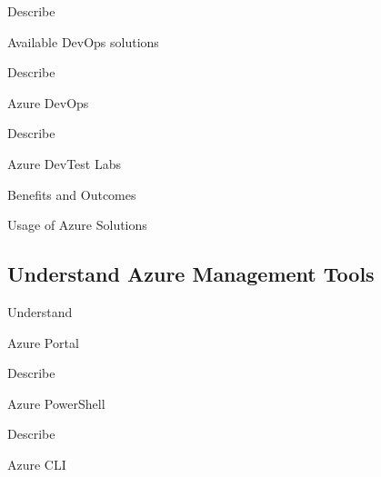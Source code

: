 \documentclass{scrartcl}
\newenvironment{flashcard}[2][]{%
    #1
    \vfill
    \centerline{\Large{#2}}
    \vfill
    \newpage
}
{\newpage}
\newcommand{\subsectioncard}[1]{
    \vspace*{\stretch{1}}
    \subsection{#1}
    \vspace*{\stretch{1}}
    \pagebreak
}
\begin{document}
    \begin{flashcard}[Describe]{Available DevOps solutions}

    \end{flashcard}

    \begin{flashcard}[Describe]{Azure DevOps}

    \end{flashcard}

    \begin{flashcard}[Describe]{Azure DevTest Labs}

    \end{flashcard}

    \begin{flashcard}[Benefits and Outcomes]{Usage of Azure Solutions}

    \end{flashcard}

    \subsectioncard{Understand Azure Management Tools}

    \begin{flashcard}[Understand]{Azure Portal}

    \end{flashcard}

    \begin{flashcard}[Describe]{Azure PowerShell}

    \end{flashcard}

    \begin{flashcard}[Describe]{Azure CLI}

    \end{flashcard}
\end{document}
